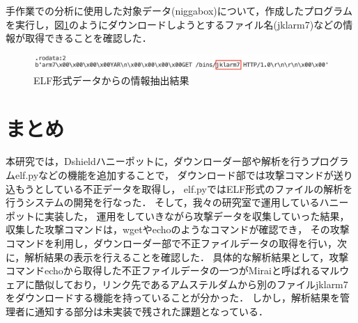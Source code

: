 \documentclass[dvipdfmx]{bta}
\begin{document}




手作業での分析に使用した対象データ(niggabox)について，作成したプログラムを実行し，図\ref{fig:jklarm7}のようにダウンロードしようとするファイル名(jklarm7)などの情報が取得できることを確認した．


\begin{figure}[htbp]
	\centering
 	\includegraphics[scale = 0.6]
	{jklarm7.png}
 	\caption{ELF形式データからの情報抽出結果}\label{fig:jklarm7}
\end{figure}


\chapter{まとめ}

本研究では，Dshieldハニーポットに，ダウンローダー部や解析を行うプログラムelf.pyなどの機能を追加することで，
ダウンロード部では攻撃コマンドが送り込もうとしている不正データを取得し，
elf.pyではELF形式のファイルの解析を行うシステムの開発を行なった．
そして，我々の研究室で運用しているハニーポットに実装した，
運用をしていきながら攻撃データを収集していった結果，
収集した攻撃コマンドは，wgetやechoのようなコマンドが確認でき，
その攻撃コマンドを利用し，ダウンローダー部で不正ファイルデータの取得を行い，次に，解析結果の表示を行えることを確認した．
具体的な解析結果として，攻撃コマンドechoから取得した不正ファイルデータの一つがMiraiと呼ばれるマルウェアに酷似しており，リンク先であるアムステルダムから別のファイルjklarm7をダウンロードする機能を持っていることが分かった．
しかし，解析結果を管理者に通知する部分は未実装で残された課題となっている．
\end{document}
